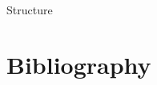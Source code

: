 \documentclass{beamer}
\begin{document}
\maketitle

\begin{frame}{Structure}
  \tableofcontents[hideallsubsections]
\end{frame}





\section{Bibliography}

\nocite{*}

\begin{frame}[allowframebreaks]{\insertsubsection}
    \begingroup
    \small
    \beamertemplatebookbibitems
    
    
    \endgroup
\end{frame}
\end{document}
